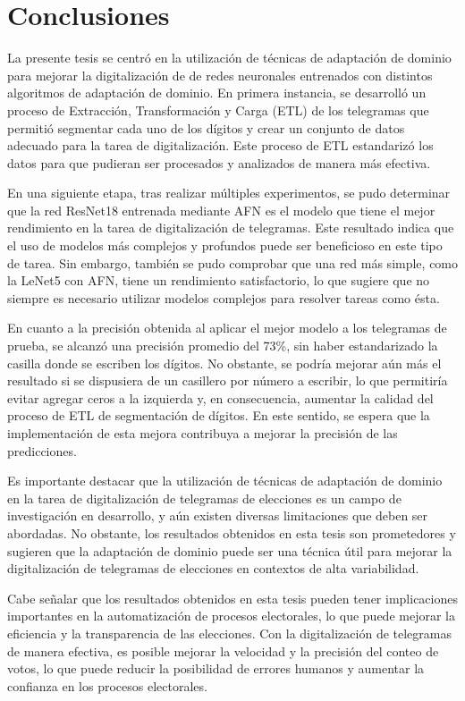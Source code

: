 \chapter{Conclusiones}

\label{Chapter5}

La presente tesis se centró en la utilización de técnicas de adaptación de dominio para mejorar la digitalización de de
redes neuronales entrenados con distintos algoritmos de adaptación de dominio. En primera instancia, se desarrolló un
proceso de Extracción, Transformación y Carga (ETL) de los telegramas que permitió segmentar cada uno de los dígitos y
crear un conjunto de datos adecuado para la tarea de digitalización. Este proceso de ETL estandarizó los datos para que
pudieran ser procesados y analizados de manera más efectiva.

En una siguiente etapa, tras realizar múltiples experimentos, se pudo determinar que la red ResNet18 entrenada mediante
AFN es el modelo que tiene el mejor rendimiento en la tarea de digitalización de telegramas. Este resultado indica que
el uso de modelos más complejos y profundos puede ser beneficioso en este tipo de tarea. Sin embargo, también se pudo
comprobar que una red más simple, como la LeNet5 con AFN, tiene un rendimiento satisfactorio, lo que sugiere que no
siempre es necesario utilizar modelos complejos para resolver tareas como ésta.

En cuanto a la precisión obtenida al aplicar el mejor modelo a los telegramas de prueba, se alcanzó una precisión
promedio del 73\%, sin haber estandarizado la casilla donde se escriben los dígitos. No obstante, se podría mejorar aún
más el resultado si se dispusiera de un casillero por número a escribir, lo que permitiría evitar agregar ceros a la
izquierda y, en consecuencia, aumentar la calidad del proceso de ETL de segmentación de dígitos. En este sentido, se
espera que la implementación de esta mejora contribuya a mejorar la precisión de las predicciones.

Es importante destacar que la utilización de técnicas de adaptación de dominio en la tarea de digitalización de
telegramas de elecciones es un campo de investigación en desarrollo, y aún existen diversas limitaciones que deben ser
abordadas. No obstante, los resultados obtenidos en esta tesis son prometedores y sugieren que la adaptación de dominio
puede ser una técnica útil para mejorar la digitalización de telegramas de elecciones en contextos de alta
variabilidad.

Cabe señalar que los resultados obtenidos en esta tesis pueden tener implicaciones importantes en la automatización de
procesos electorales, lo que puede mejorar la eficiencia y la transparencia de las elecciones. Con la digitalización de
telegramas de manera efectiva, es posible mejorar la velocidad y la precisión del conteo de votos, lo que puede reducir
la posibilidad de errores humanos y aumentar la confianza en los procesos electorales.

